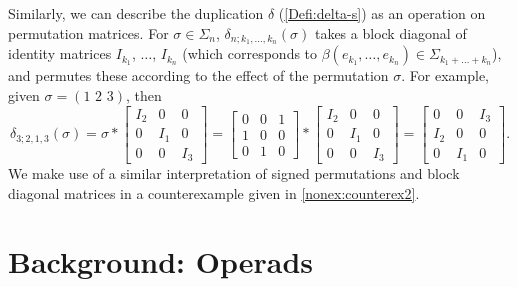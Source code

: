 \begin{remark}
Similarly, we can describe the duplication $\delta$ (\cref{Defi:delta-s}) as an operation on permutation matrices. For $\sigma \in \Sigma_n$, $\delta_{n;k_1,\ldots,k_n}(\sigma)$ takes a block diagonal of identity matrices $I_{k_1}$, $\ldots$, $I_{k_n}$ (which corresponds to $\beta(e_{k_1},\ldots,e_{k_n}) \in \Sigma_{k_1+\ldots+k_n}$), and permutes these according to the effect of the permutation $\sigma$. For example, given $\sigma = (1 \,\, 2 \,\, 3)$, then
  \[
    \delta_{3;2,1,3}(\sigma) =
    \sigma
    \ast
    \begin{bmatrix}
    I_2 & 0 & 0 \\
    0 & I_1 & 0 \\
    0 & 0 & I_3
    \end{bmatrix}
    =
      \begin{bmatrix}
      0 & 0 & 1 \\
      1 & 0 & 0 \\
      0 & 1 & 0
      \end{bmatrix}
    \ast
    \begin{bmatrix}
    I_2 & 0 & 0 \\
    0 & I_1 & 0 \\
    0 & 0 & I_3
    \end{bmatrix}
    =
    \begin{bmatrix}
    0 & 0 & I_3 \\
    I_2 & 0 & 0 \\
    0 & I_1 & 0
    \end{bmatrix}.
  \]
We make use of a similar interpretation of signed permutations and block diagonal matrices in a counterexample given in \cref{nonex:counterex2}.
\end{remark}




\section{Background: Operads}\label{sec:back-op}

